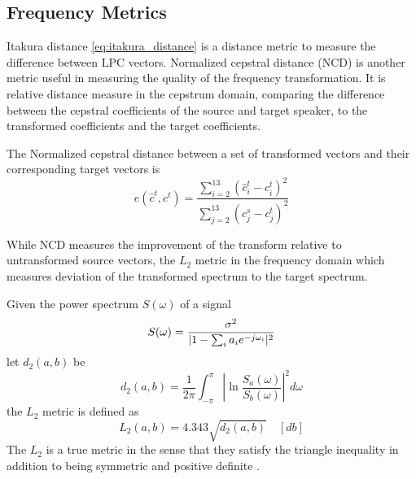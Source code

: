 \subsection{Frequency Metrics} %
\label{sub:frequency_metrics}
Itakura distance \eqref{eq:itakura_distance} is a distance metric to measure the difference between LPC vectors. Normalized cepstral distance (NCD) is another metric useful in measuring the quality of the frequency transformation. It is relative distance measure in the cepstrum domain, comparing the difference between the cepstral coefficients of the source and target speaker, to the transformed coefficients and the target coefficients.
\begin{definition}
	The Normalized cepstral distance between a set of transformed vectors and their corresponding target vectors is
	\begin{equation}
		e(\hat{c}^t,c^t) = \frac{{\sum}_{i=2}^{13}(\hat{c}_{i}^t-c_{i}^t)^2}{\sum_{j=2}^{13}(c_{j}^s-c_{j}^t)^2}
	\end{equation}
\end{definition}

While NCD measures the improvement of the transform relative to untransformed source vectors, the $L_2$ metric in the frequency domain which measures deviation of the transformed spectrum to the target spectrum.

\begin{definition}
	Given the power spectrum $S(\omega)$ of a signal
\begin{equation}
	S(\omega) = \frac{\sigma^2}{\lvert1-\sum_{i}a_i e^{-j\omega_i}\rvert^2}
\end{equation}
let $d_2(a,b)$ be 
\begin{equation}
	d_2(a,b) = \frac{1}{2\pi}\int_{-\pi}^{\pi}\left\lvert\ln \frac{S_a(\omega)}{S_b(\omega)}\right\rvert^2 d\omega
\end{equation}
the $L_2$ metric is defined as \cite{gray76}
\begin{equation}
	\label{eq:l2_metric}
	L_2(a,b)  = 4.343 \sqrt{d_2(a,b)} \quad [db]
\end{equation}
The $L_2$ is a true metric in the sense that they satisfy the triangle inequality in addition to being symmetric and positive definite \cite{kreyszig89}.
\end{definition}

